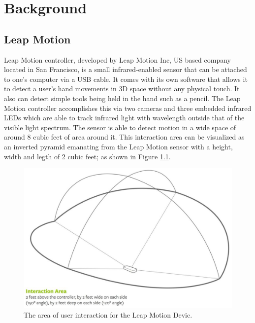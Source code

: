 
\chapter{Background}

\label{Chapter1} 

\section{Leap Motion}
Leap Motion controller, developed by Leap Motion Inc, US based company located in San Francisco, is a small infrared-enabled sensor that can be attached to one’s computer via a USB cable. It comes with its own software that allows it to detect a user’s hand movements in 3D space without any physical touch. It also can detect simple tools being held in the hand such as a pencil. The Leap Motion controller accomplishes this via two cameras and three embedded infrared LEDs which are able to track infrared light with wavelength outside that of the visible light spectrum. The sensor is able to detect motion in a wide space of around 8 cubic feet of area around it. This interaction area can be visualized as an inverted pyramid emanating from the Leap Motion sensor with a height, width and legth of 2 cubic feet; as shown in Figure \ref{fig:LeapInteractionArea}.
\begin{figure}[th]
\centering
\includegraphics[scale=0.35]{Figures/LeapInteractionArea.JPG}
\caption{The area of user interaction for the Leap Motion Devic.}
\label{fig:LeapInteractionArea}
\end{figure}

